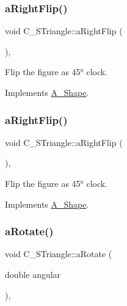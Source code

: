 \subsubsection{\texorpdfstring{a\+Right\+Flip()}{aRightFlip()}\hspace{0.1cm}{\footnotesize\ttfamily [1/2]}}
{\footnotesize\ttfamily void C\+\_\+\+S\+Triangle\+::a\+Right\+Flip (\begin{DoxyParamCaption}{ }\end{DoxyParamCaption})\hspace{0.3cm}{\ttfamily [override]}, {\ttfamily [virtual]}}



Flip the figure as 45° clock. 



Implements \hyperlink{classA__Shape_a892688cbbad3297e00e87cce0dbfc76d}{A\+\_\+\+Shape}.

\mbox{\label{classC__STriangle_aa3cad7b7367c253000cf0f91f55ba600}} 
\subsubsection{\texorpdfstring{a\+Right\+Flip()}{aRightFlip()}\hspace{0.1cm}{\footnotesize\ttfamily [2/2]}}
{\footnotesize\ttfamily void C\+\_\+\+S\+Triangle\+::a\+Right\+Flip (\begin{DoxyParamCaption}{ }\end{DoxyParamCaption})\hspace{0.3cm}{\ttfamily [override]}, {\ttfamily [virtual]}}



Flip the figure as 45° clock. 



Implements \hyperlink{classA__Shape_a892688cbbad3297e00e87cce0dbfc76d}{A\+\_\+\+Shape}.

\mbox{\label{classC__STriangle_a52612242aba17043862355c030637a18}} 
\subsubsection{\texorpdfstring{a\+Rotate()}{aRotate()}\hspace{0.1cm}{\footnotesize\ttfamily [1/2]}}
{\footnotesize\ttfamily void C\+\_\+\+S\+Triangle\+::a\+Rotate (\begin{DoxyParamCaption}\item[{double}]{angular }\end{DoxyParamCaption})\hspace{0.3cm}{\ttfamily [override]}, {\ttfamily [virtual]}}



